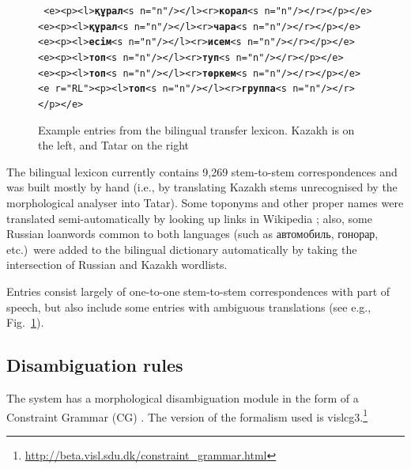 \documentclass[a4paper,11pt]{article}
\begin{document}
\begin{figure}[bhtp]
\hspace{3cm}\parbox[t]{0.7\textwidth}{{\tt
    <e><p><l>\textbf{құрал}<s n="n"/></l><r>\textbf{корал}<s n="n"/></r></p></e> \\
    <e><p><l>\textbf{құрал}<s n="n"/></l><r>\textbf{чара}<s n="n"/></r></p></e> \\
    <e><p><l>\textbf{есім}<s n="n"/></l><r>\textbf{исем}<s n="n"/></r></p></e> \\
    <e><p><l>\textbf{топ}<s n="n"/></l><r>\textbf{туп}<s n="n"/></r></p></e> \\
    <e><p><l>\textbf{топ}<s n="n"/></l><r>\textbf{төркем}<s n="n"/></r></p></e> \\
    <e r="RL"><p><l>\textbf{топ}<s n="n"/></l><r>\textbf{группа}<s n="n"/></r></p></e>
}}%
\caption{Example entries from the bilingual transfer lexicon. Kazakh is on the left, and Tatar on the right}
\label{fig:bidix}
\end{figure}

The bilingual lexicon currently contains 9,269 stem-to-stem correspondences and was built mostly 
by hand (i.e., by translating Kazakh stems unrecognised by the morphological analyser into Tatar).  Some 
toponyms and other proper names were translated semi-automatically by looking up links in Wikipedia \citep{tyers08}; also, 
some Russian loanwords common to both languages (such as автомобиль, гонорар, etc.)\ were added to the bilingual 
dictionary automatically by taking the intersection of Russian and Kazakh wordlists.

Entries consist largely of one-to-one stem-to-stem correspondences with part of speech, but also include some entries with ambiguous translations (see e.g., Fig.~\ref{fig:bidix}).

\subsection{Disambiguation rules}

The system has a morphological disambiguation module in the form of a 
Constraint Grammar (CG) \citep{karlsson95}. The version of the formalism used is vislcg3.\footnote{\url{http://beta.visl.sdu.dk/constraint_grammar.html}}

\end{document}
